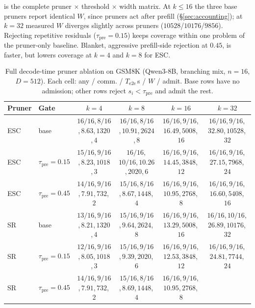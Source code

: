  is the complete pruner $\times$ threshold $\times$ width matrix.
At $k\le16$ the three base pruners report identical $W$, since pruners act after prefill (\S\ref{sec:accounting}); at $k{=}32$ measured $W$ diverges slightly across pruners ($10528$/$10176$/$9856$).
Rejecting repetitive residuals ($\tau_{\mathrm{pre}}{=}0.15$) keeps coverage within one problem of the pruner-only baseline.
Blanket, aggressive prefill-side rejection at $0.45$, is faster, but
lowers coverage at $k{=}4$ and $k{=}8$ for ESC.

\begin{table}[t]
\centering
\caption{Full decode-time pruner ablation on GSM8K (Qwen3-8B, branching mix, $n{=}16$, $D{=}512$).
Each cell: any / comm. / $T_{\mathrm{e2e}}$\,s / $W$ / admit.
Base rows have no admission; other rows reject $s_i{<}\tau_{\mathrm{pre}}$ and admit the rest.}
\label{tab:ablate-thresh}
\scriptsize
\setlength{\tabcolsep}{1.8pt}
\begin{tabular}{@{}llcccc@{}}
\toprule
Pruner & Gate & $k{=}4$ & $k{=}8$ & $k{=}16$ & $k{=}32$ \\
\midrule
ESC
 & base
 & $16/16$,\,$8/16$,\,$8.63$,\,$1320$,\,$4$
 & $16/16$,\,$8/16$,\,$10.91$,\,$2624$,\,$8$
 & $16/16$,\,$9/16$,\,$16.49$,\,$5008$,\,$16$
 & $16/16$,\,$9/16$,\,$32.80$,\,$10528$,\,$32$ \\
\rowcolor{tblalt}
ESC
 & $\tau_{\mathrm{pre}}{=}0.15$
 & $15/16$,\,$9/16$,\,$8.23$,\,$1018$,\,$3$
 & $16/16$,\,$10/16$,\,$10.26$,\,$2020$,\,$6$
 & $16/16$,\,$9/16$,\,$14.45$,\,$3848$,\,$12$
 & $16/16$,\,$9/16$,\,$27.15$,\,$7968$,\,$24$ \\
ESC
 & $\tau_{\mathrm{pre}}{=}0.45$
 & $14/16$,\,$9/16$,\,$7.91$,\,$732$,\,$2$
 & $15/16$,\,$8/16$,\,$8.67$,\,$1448$,\,$4$
 & $16/16$,\,$9/16$,\,$10.95$,\,$2768$,\,$8$
 & $16/16$,\,$9/16$,\,$16.60$,\,$5408$,\,$16$ \\
\midrule
SR
 & base
 & $13/16$,\,$9/16$,\,$8.21$,\,$1320$,\,$4$
 & $15/16$,\,$9/16$,\,$9.64$,\,$2624$,\,$8$
 & $16/16$,\,$9/16$,\,$13.29$,\,$5008$,\,$16$
 & $16/16$,\,$10/16$,\,$26.89$,\,$10176$,\,$32$ \\
\rowcolor{tblalt}
SR
 & $\tau_{\mathrm{pre}}{=}0.15$
 & $12/16$,\,$9/16$,\,$8.05$,\,$1018$,\,$3$
 & $15/16$,\,$9/16$,\,$9.39$,\,$2020$,\,$6$
 & $16/16$,\,$9/16$,\,$12.53$,\,$3848$,\,$12$
 & $16/16$,\,$9/16$,\,$24.81$,\,$7744$,\,$24$ \\
SR
 & $\tau_{\mathrm{pre}}{=}0.45$
 & $14/16$,\,$9/16$,\,$7.91$,\,$732$,\,$2$
 & $15/16$,\,$8/16$,\,$8.69$,\,$1448$,\,$4$
 & $16/16$,\,$9/16$,\,$10.95$,\,$2768$,\,$8$

\end{tabular}
\end{table}
